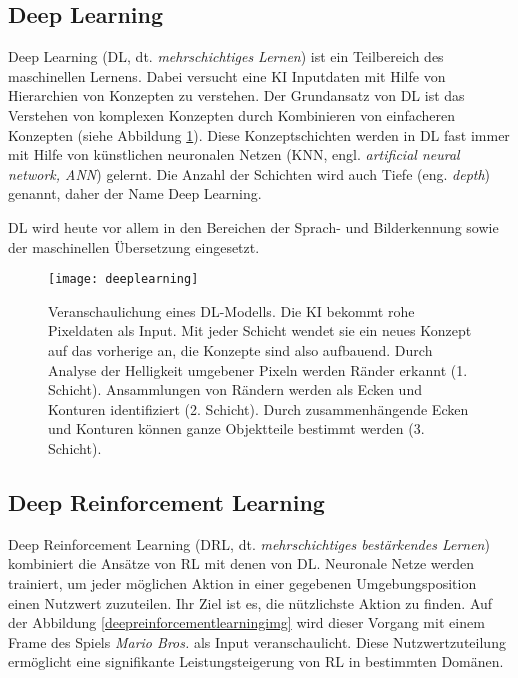 \subsection{Deep Learning}
Deep Learning (DL, dt. \emph{mehrschichtiges Lernen}) ist ein Teilbereich des maschinellen Lernens. Dabei versucht eine KI Inputdaten mit Hilfe von Hierarchien von Konzepten zu verstehen. Der Grundansatz von DL ist das Verstehen von komplexen Konzepten durch Kombinieren von einfacheren Konzepten (siehe Abbildung \ref{deeplearningimg}). Diese Konzeptschichten werden in DL fast immer mit Hilfe von künstlichen neuronalen Netzen (KNN, engl. \emph{artificial neural network, ANN}) gelernt.  Die Anzahl der Schichten wird auch Tiefe (eng. \emph{depth}) genannt, daher der Name Deep Learning.

DL wird heute vor allem in den Bereichen der Sprach- und Bilderkennung sowie der maschinellen Übersetzung eingesetzt. 

\begin{figure}
  \texttt{[image: deeplearning]}
  \caption{Veranschaulichung eines DL-Modells. Die KI bekommt rohe Pixeldaten als Input. Mit jeder Schicht wendet sie ein neues Konzept auf das vorherige an, die Konzepte sind also aufbauend. Durch Analyse der Helligkeit umgebener Pixeln werden Ränder erkannt (1. Schicht). Ansammlungen von Rändern werden als Ecken und Konturen identifiziert (2. Schicht). Durch zusammenhängende Ecken und Konturen können ganze Objektteile bestimmt werden (3. Schicht).  }
  \label{deeplearningimg}
\end{figure}
\subsection{Deep Reinforcement Learning}

Deep Reinforcement Learning (DRL, dt. \emph{mehrschichtiges bestärkendes Lernen}) kombiniert die Ansätze von RL mit denen von DL. Neuronale Netze werden trainiert, um jeder möglichen Aktion in einer gegebenen Umgebungsposition einen Nutzwert zuzuteilen. Ihr Ziel ist es, die nützlichste Aktion zu finden.  Auf der Abbildung \ref{deepreinforcementlearningimg} wird dieser Vorgang mit einem Frame des Spiels \emph{Mario Bros.} als Input veranschaulicht. Diese Nutzwertzuteilung ermöglicht eine signifikante Leistungsteigerung von RL in bestimmten Domänen.

